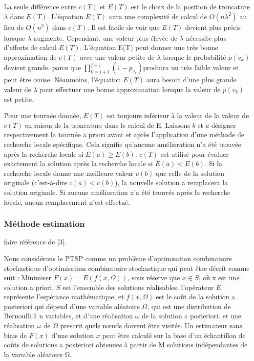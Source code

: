 \documentclass[]{article}
\begin{document}
La seule différence entre \(c(T)\) et \(E(T)\) est le choix de la
position de troncature \(\lambda \) dans \(E(T)\). L'équation \(E(T)\)
aura une complexité de calcul de \(O(n  \lambda^2 )\) au lieu de
\(O(n^3 )\) dans \(c(T)\). Il est facile de voir que \(E(T)\) devient
plus précis lorsque \(\lambda\) augmente. Cependant, une valeur plus
élevée de \(\lambda \) nécessite plus d'efforts de calcul \(E(T)\).
L'équation E(T) peut donner une très bonne approximation de \(c(T)\)
avec une valeur petite de \(\lambda\) lorsque le probabilité \(p(v_k)\)
devient grande, parce que \(\prod_{k=i+1}^{j-1}(1-p_{v_k})\)produira un
très faible valeur et peut être omise. Néanmoins, l'équation \(E(T)\)
aura besoin d'une plus grande valeur de \(\lambda\) pour effectuer une
bonne approximation lorsque la valeur de \(p (v_k)\) est petite.

Pour une tournée donnée, \(E(T)\) est toujours inférieur à la valeur de
la valeur de \(c(T)\) en raison de la troncature dans le calcul de E.
Laissons \(b\) et \(a\) désigner respectivement la tournée a priori
avant et après l'application d'une méthode de recherche locale
spécifique. Cela signifie qu'aucune amélioration n'a été trouvée après
la recherche locale si \(E(a)\ge E(b)\). \(c(T)\) est utilisé pour
évaluer exactement la solution après la recherche locale si
\(E(a) < E(b) \). Si la recherche locale donne une meilleure valeur
\(c(b)\) que celle de la solution originale (c'est-à-dire
\(c(a) < c(b)\)), la nouvelle solution a remplacera la solution
originale. Si aucune amélioration n'a été trouvée après la recherche
locale, aucun remplacement n'est effectué.

\hypertarget{muxe9thode-estimation}{%
\subsubsection{Méthode estimation}\label{muxe9thode-estimation}}

faire référence de {[}3{]}.

Nous considérons le PTSP comme un problème d'optimisation combinatoire
stochastique d'optimisation combinatoire stochastique qui peut être
décrit comme suit : Minimiser \(F (x) = E (f (x, \Omega))\), sous
réserve que \(x \in S\), où x est une solution a priori, \(S\) est
l'ensemble des solutions réalisables, l'opérateur \(E\) représente
l'espérance mathématique, et \(f (x, \Omega)\) est le coût de la
solution a posteriori qui dépend d'une variable aléatoire \(\Omega\),
qui est une distribution de Bernoulli à n variables, et d'une
réalisation \(\omega\) de la solution a posteriori. et une réalisation
\(\omega\) de \(\Omega\) prescrit quels nœuds doivent être visités. Un
estimateur sans biais de \(F (x)\) d'une solution \(x \) peut être
calculé sur la base d'un échantillon de coûts de solutions a posteriori
obtenues à partir de M solutions indépendantes de la variable aléatoire
Ω.
\end{document}
